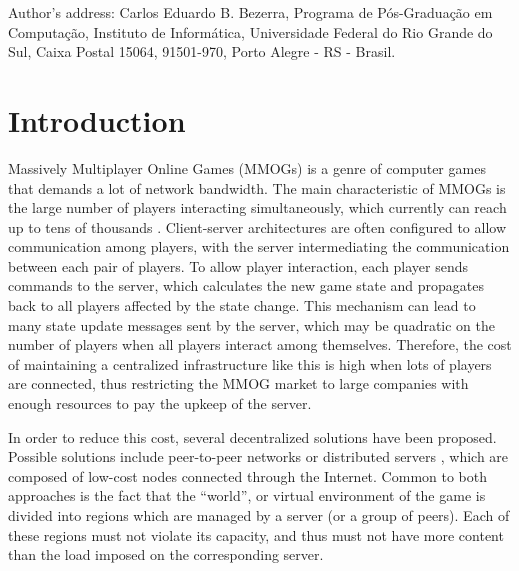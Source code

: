 \documentclass[acmjacm]{acmtrans2m}
\title{\titulo}
\author{CARLOS EDUARDO B. BEZERRA, JOÃO L. D. COMBA and CLÁUDIO F. R. GEYER\\Universidade Federal do Rio Grande do Sul}
\let\mycounter\setcounter
\begin{document}
\setcounter{page}{1}



{\let\setcounter\mycounter
    \begin{bottomstuff}
    	Author's address: Carlos Eduardo B. Bezerra, Programa de Pós-Graduação em Computação,
		Instituto de Informática, Universidade Federal do Rio Grande do Sul,
		Caixa Postal 15064, 91501-970, Porto Alegre - RS - Brasil.
    \end{bottomstuff}
}

\maketitle


\section{Introduction}

Massively Multiplayer Online Games (MMOGs) is a genre of computer games that demands a lot of network
bandwidth. The main characteristic of MMOGs is the large number of players interacting simultaneously, which currently can reach up to tens of thousands \cite{schiele2007rpp}. 
Client-server architectures are often configured to allow communication among players, with the server intermediating the communication between each pair of players. 
To allow player interaction, each player sends commands to the server, which calculates the new game state and propagates back to all players affected by the state change. This mechanism can lead to many state update messages sent by the server, which may be quadratic on the number of players when all players interact among themselves. Therefore, the cost of maintaining a centralized infrastructure like this is high when lots of players are connected, thus restricting the MMOG market to large companies with enough resources to pay the upkeep of the server.

In order to reduce this cost, several decentralized solutions have been proposed. Possible solutions include peer-to-peer networks \cite{schiele2007rpp,rieche2007ppb,hampel2006ppa,elrhalibi2005abm,iimura2004zfg,knutsson2004pps} or distributed servers
\cite{ng2002msa,chertov:olb,lee2003sdl,assiotis2006dam},
which are composed of low-cost nodes connected through the Internet. Common to both approaches is the fact that the ``world'', or virtual environment of the game is divided into regions which are managed by a server (or a group of peers). Each of these regions must not violate its capacity, and thus must not have more content than the load imposed on the corresponding server.
\end{document}
